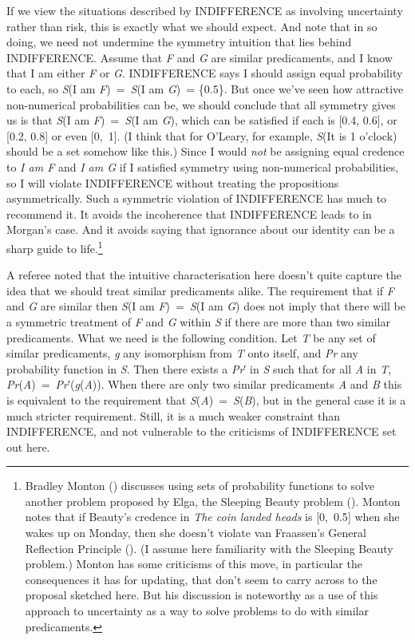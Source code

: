 \documentclass[
  11pt,
  letterpaper,
  DIV=11,
  numbers=noendperiod,
  twoside]{scrartcl}
\begin{document}
If we view the situations described by INDIFFERENCE as involving
uncertainty rather than risk, this is exactly what we should expect. And
note that in so doing, we need not undermine the symmetry intuition that
lies behind INDIFFERENCE. Assume that \emph{F} and \emph{G} are similar
predicaments, and I know that I am either \emph{F} or \emph{G}.
INDIFFERENCE says I should assign equal probability to each, so
\emph{S}(I am \emph{F})~=~\emph{S}(I am \emph{G})~= \{0.5\}. But once
we've seen how attractive non-numerical probabilities can be, we should
conclude that all symmetry gives us is that \emph{S}(I am
\emph{F})~=~\emph{S}(I am \emph{G}), which can be satisfied if each is
{[}0.4, 0.6{]}, or {[}0.2, 0.8{]} or even {[}0,~1{]}. (I think that for
O'Leary, for example, \emph{S}(It is 1 o'clock) should be a set somehow
like this.) Since I would \emph{not} be assigning equal credence to
\emph{I am F} and \emph{I am G} if I satisfied symmetry using
non-numerical probabilities, so I will violate INDIFFERENCE without
treating the propositions asymmetrically. Such a symmetric violation of
INDIFFERENCE has much to recommend it. It avoids the incoherence that
INDIFFERENCE leads to in Morgan's case. And it avoids saying that
ignorance about our identity can be a sharp guide to life.\footnote{Bradley
  Monton () discusses using sets of
  probability functions to solve another problem proposed by Elga, the
  Sleeping Beauty problem ().
  Monton notes that if Beauty's credence in \emph{The coin landed heads}
  is {[}0,~0.5{]} when she wakes up on Monday, then she doesn't violate
  van Fraassen's General Reflection Principle
  (). (I assume here
  familiarity with the Sleeping Beauty problem.) Monton has some
  criticisms of this move, in particular the consequences it has for
  updating, that don't seem to carry across to the proposal sketched
  here. But his discussion is noteworthy as a use of this approach to
  uncertainty as a way to solve problems to do with similar
  predicaments.}

A referee noted that the intuitive characterisation here doesn't quite
capture the idea that we should treat similar predicaments alike. The
requirement that if \emph{F} and \emph{G} are similar then \emph{S}(I am
\emph{F})~=~\emph{S}(I am \emph{G}) does not imply that there will be a
symmetric treatment of \emph{F} and \emph{G} within \emph{S} if there
are more than two similar predicaments. What we need is the following
condition. Let \emph{T} be any set of similar predicaments, \emph{g} any
isomorphism from \emph{T} onto itself, and \emph{Pr} any probability
function in \emph{S}. Then there exists a \emph{Pr}′ in \emph{S} such
that for all \emph{A} in \emph{T},
\emph{Pr}(\emph{A})~=~\emph{Pr}′(\emph{g}(\emph{A})). When there are
only two similar predicaments \emph{A} and \emph{B} this is equivalent
to the requirement that \emph{S}(\emph{A})~=~\emph{S}(\emph{B}), but in
the general case it is a much stricter requirement. Still, it is a much
weaker constraint than INDIFFERENCE, and not vulnerable to the
criticisms of INDIFFERENCE set out here.
\end{document}
